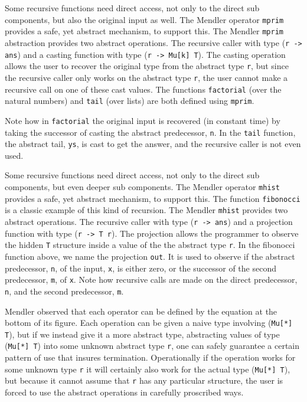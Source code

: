 Some recursive functions need direct access, not only to the direct sub components,
but also the original input as well. The Mendler operator \verb+mprim+ provides
a safe, yet abstract mechanism, to support this. The Mendler \verb+mprim+
abstraction provides two abstract operations. The recursive caller with type
(\verb+r -> ans+) and a casting function with type (\verb+r -> Mu[k] T+). The
casting operation allows the user to recover the original type from the abstract
type \verb+r+, but since the recursive caller
only works on the abstract type \verb+r+, the user cannot make a recursive call
on one of these cast values. The functions
\verb+factorial+ (over the natural numbers) and \verb+tail+ (over lists) are both
defined using \verb+mprim+.

Note how in \verb+factorial+ the original input is recovered (in constant time)
by taking the successor of casting the abstract predecessor, \verb+n+. In the
\verb+tail+ function, the abstract tail, \verb+ys+, is cast to get the
answer, and the recursive caller is not even used.

Some recursive functions need direct access, not only to the direct sub components,
but even deeper sub components. The Mendler operator \verb+mhist+ provides
a safe, yet abstract mechanism, to support this. The function \verb+fibonocci+
is a classic example of this kind of recursion.  The Mendler \verb+mhist+
provides two abstract operations. The recursive caller with type
(\verb+r -> ans+) and a projection function with type (\verb+r -> T r+). The projection
allows the programmer to observe the hidden \verb+T+ structure inside a value
of the the abstract type \verb+r+.
In the fibonocci function above, we name the projection \verb+out+. It is used
to observe if the abstract predecessor, \verb+n+, of the input, \verb+x+, is either
zero, or the successor of the second predecessor, \verb+m+, of \verb+x+. Note
how recursive calls are made on the direct predecessor, \verb+n+, and the second  predecessor,
\verb+m+.

Mendler observed that each operator can be defined
by the equation at the bottom of its figure. Each operation can be given
a naive type involving (\verb+Mu[*] T+), but if we instead give it a more abstract type,
abstracting values of type (\verb+Mu[*] T+) into some unknown abstract type \verb+r+, 
one can safely guarantee a certain pattern of use that insures termination.  Operationally
if the operation works for some unknown type \verb+r+
it will certainly also work for the actual type (\verb+Mu[*] T+), but because it cannot
assume that \verb+r+ has any particular structure, the user is forced to use
the abstract operations in carefully proscribed ways.
  
